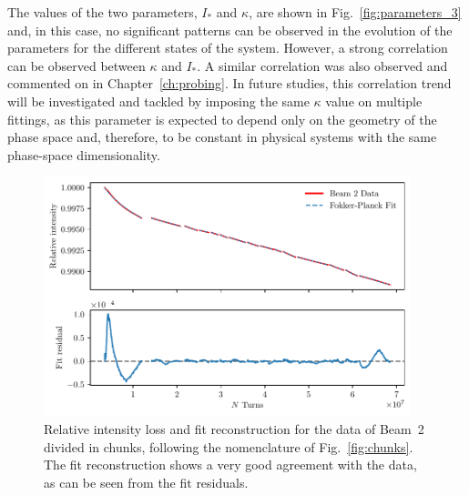 The values of the two parameters, $I_\ast$ and $\kappa$, are shown in Fig.~\ref{fig:parameters_3} and, in this case, no significant patterns can be observed in the evolution of the parameters for the different states of the system. However, a strong correlation can be observed between $\kappa$ and $I_\ast$. A similar correlation was also observed and commented on in Chapter~\ref{ch:probing}. In future studies, this correlation trend will be investigated and tackled by imposing the same $\kappa$ value on multiple fittings, as this parameter is expected to depend only on the geometry of the phase space and, therefore, to be constant in physical systems with the same phase-space dimensionality. 


\begin{figure}[th]
    \centering
    \includegraphics[width=0.95\textwidth]{5_wire_compensators_LHC/figs/losses_b2.pdf}
    \caption{Relative intensity loss and fit reconstruction for the data of Beam~2 divided in chunks, following the nomenclature of Fig.~\ref{fig:chunks}. 
    The fit reconstruction shows a very good agreement with the data, as can be seen from the fit residuals.}
    \label{fig:reconstruction_4}
\end{figure}

